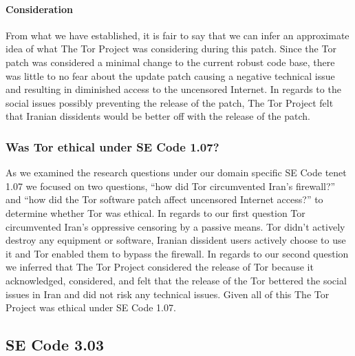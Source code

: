 \documentclass[11pt]{article}
\begin{document}
\begin{multicols}{2}
\paragraph{Consideration}

From what we have established, it is fair to say that we can infer an
approximate idea of what The Tor Project was considering during this patch.
Since the Tor patch was considered a minimal change to the current robust code
base, there was little to no fear about the update patch causing a negative
technical issue and resulting in diminished access to the uncensored Internet.
In regards to the social issues possibly preventing the release of the patch,
The Tor Project felt that Iranian dissidents would be better off with the
release of the patch.

\subsubsection{Was Tor ethical under SE Code 1.07?} 

As we examined the research questions under our domain specific SE Code tenet
1.07 we focused on two questions, ``how did Tor circumvented Iran's firewall?''
and ``how did the Tor software patch affect uncensored Internet access?'' to
determine whether Tor was ethical. In regards to our first question Tor
circumvented Iran's oppressive censoring by a passive means. Tor didn't actively
destroy any equipment or software, Iranian dissident users actively choose to
use it and Tor enabled them to bypass the firewall. In regards to our second
question we inferred that The Tor Project considered the release of Tor because
it acknowledged, considered, and felt that the release of the Tor bettered the
social issues in Iran and did not risk any technical issues. Given all of this
The Tor Project was ethical under SE Code 1.07.

\subsection{SE Code 3.03}


\end{multicols}
\end{document}
